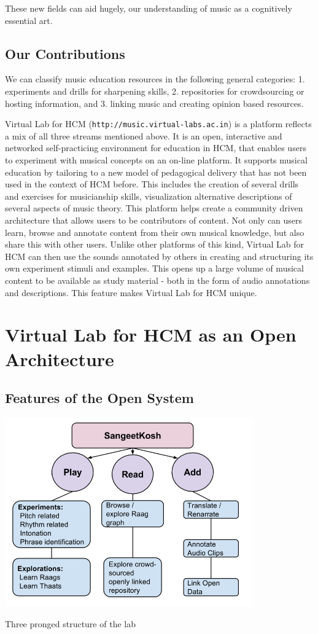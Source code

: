\documentclass{tufte-handout}
\begin{document}
These new fields can aid hugely, our understanding of music as a cognitively essential art. 

\subsection{Our Contributions}
We can classify music education resources in the following general categories: 1. experiments and drills for sharpening skills, 2. repositories for crowdsourcing or hosting information, and 3. linking music and creating opinion based resources. 

Virtual Lab for HCM (\texttt{http://music.virtual-labs.ac.in}) is a platform reflects a mix of all three streams mentioned above. It is an open, interactive and networked self-practicing environment for education in HCM, that enables users to experiment with musical concepts on an on-line platform. It supports musical education by tailoring to a new model of pedagogical delivery that has not been used in the context of HCM before. This includes the creation of several drills and exercises for musicianship skills, visualization alternative descriptions of several aspects of music theory. This platform helps create a community driven architecture that allows users to be contributors of content. Not only can users learn, browse and annotate content from their own musical knowledge, but also share this with other users. Unlike other platforms of this kind, Virtual Lab for HCM can then use the sounds annotated by others in creating and structuring its own experiment stimuli and examples. This  opens up a large volume of musical content to be available as study material - both in the form of audio annotations and descriptions. This feature makes Virtual Lab for HCM unique.


\section{Virtual Lab for HCM as an Open Architecture}

\subsection{Features of the Open System}
\begin{marginfigure}
\centering
    \includegraphics[width=0.8\textwidth]{threeprong.png}
\caption{Three pronged structure of the lab}
\label{fig:opensystem}
\end{marginfigure}
\end{document}
